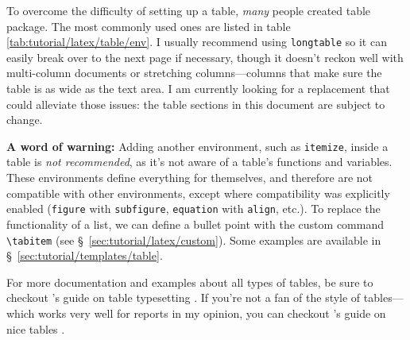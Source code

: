 To overcome the difficulty of setting up a table, \textit{many} people created table \gls{package}. The most commonly used ones are listed in table \ref{tab:tutorial/latex/table/env}. I usually recommend using \texttt{longtable} so it can easily break over to the next page if necessary, though it doesn't reckon well with multi-column documents or stretching columns---columns that make sure the table is as wide as the text area. I am currently looking for a replacement that could alleviate those issues: the table sections in this document are subject to change.

\textbf{A word of warning:} Adding another \gls{environment}, such as \texttt{itemize}, inside a table is \textit{not recommended}, as it's not aware of a table's functions and \glspl{variable}. These \glspl{environment} define everything for themselves, and therefore are not compatible with other \glspl{environment}, except where compatibility was explicitly enabled (\texttt{figure} with \texttt{subfigure}, \texttt{equation} with \texttt{align}, etc.). To replace the functionality of a list, we can define a bullet point with the custom \gls{command} \texttt{\textbackslash{}tabitem} (see \S~\ref{sec:tutorial/latex/custom}). Some examples are available in \S~\ref{sec:tutorial/templates/table}.

For more documentation and examples about all types of tables, be sure to checkout 's guide on table typesetting \parencite{book:voss-tables}. If you're not a fan of the  style of tables---which works very well for reports in my opinion, you can checkout 's guide on nice tables \parencite{web:guide-nice-tables}.

\begingroup
    \setlength{\columnA}{\dimexpr .25\linewidth}
    \setlength{\columnB}{\dimexpr \linewidth-\columnA}
    
    \setlength{\columnA}{\columnA-2\tabcolsep-3\vbar/2}
    \setlength{\columnB}{\columnB-2\tabcolsep-3\vbar/2}
    
